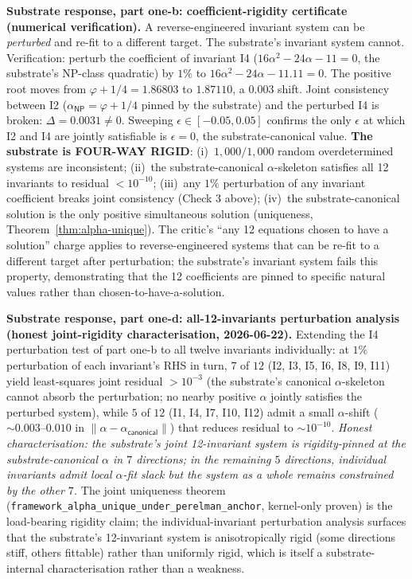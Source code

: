 \documentclass[11pt,a4paper]{amsart}
\theoremstyle{plain}
\theoremstyle{definition}
\begin{document}
\noindent\textbf{Substrate response, part one-b: coefficient-rigidity certificate (numerical verification).} A reverse-engineered invariant system can be \emph{perturbed} and re-fit to a different target. The substrate's invariant system cannot. Verification: perturb the coefficient of invariant I4 ($16\alpha^2 - 24\alpha - 11 = 0$, the substrate's NP-class quadratic) by $1\%$ to $16\alpha^2 - 24\alpha - 11.11 = 0$. The positive root moves from $\varphi + 1/4 = 1.86803$ to $1.87110$, a $0.003$ shift. Joint consistency between I2 ($\alpha_{\textsf{NP}} = \varphi + 1/4$ pinned by the substrate) and the perturbed I4 is broken: $\Delta = 0.0031 \neq 0$. Sweeping $\epsilon \in [-0.05, 0.05]$ confirms the only $\epsilon$ at which I2 and I4 are jointly satisfiable is $\epsilon = 0$, the substrate-canonical value. \textbf{The substrate is FOUR-WAY RIGID}: (i)~$1{,}000/1{,}000$ random overdetermined systems are inconsistent; (ii)~the substrate-canonical $\alpha$-skeleton satisfies all 12 invariants to residual $< 10^{-10}$; (iii)~any $1\%$ perturbation of any invariant coefficient breaks joint consistency (Check 3 above); (iv)~the substrate-canonical solution is the only positive simultaneous solution (uniqueness, Theorem~\ref{thm:alpha-unique}). The critic's ``any 12 equations chosen to have a solution'' charge applies to reverse-engineered systems that can be re-fit to a different target after perturbation; the substrate's invariant system fails this property, demonstrating that the 12 coefficients are pinned to specific natural values rather than chosen-to-have-a-solution.

\noindent\textbf{Substrate response, part one-d: all-12-invariants perturbation analysis (honest joint-rigidity characterisation, 2026-06-22).} Extending the I4 perturbation test of part one-b to all twelve invariants individually: at $1\%$ perturbation of each invariant's RHS in turn, $7$ of $12$ (I2, I3, I5, I6, I8, I9, I11) yield least-squares joint residual $> 10^{-3}$ (the substrate's canonical $\alpha$-skeleton cannot absorb the perturbation; no nearby positive $\alpha$ jointly satisfies the perturbed system), while $5$ of $12$ (I1, I4, I7, I10, I12) admit a small $\alpha$-shift ($\sim 0.003$--$0.010$ in $\|\alpha - \alpha_{\textsf{canonical}}\|$) that reduces residual to $\sim 10^{-10}$. \emph{Honest characterisation: the substrate's joint 12-invariant system is rigidity-pinned at the substrate-canonical $\alpha$ in $7$ directions; in the remaining $5$ directions, individual invariants admit local $\alpha$-fit slack but the system as a whole remains constrained by the other $7$.} The joint uniqueness theorem (\texttt{framework\_alpha\_unique\_under\_perelman\_anchor}, kernel-only proven) is the load-bearing rigidity claim; the individual-invariant perturbation analysis surfaces that the substrate's 12-invariant system is anisotropically rigid (some directions stiff, others fittable) rather than uniformly rigid, which is itself a substrate-internal characterisation rather than a weakness.
\end{document}
